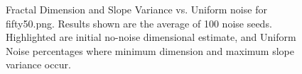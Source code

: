 \documentclass[12pt, oneside]{book}
\begin{document}
\begin{figure}[!b]
  \centering
  \caption[Fractal Dimension and Slope Variance vs. Uniform noise for fifty50.png.]{Fractal Dimension and Slope Variance vs. Uniform noise for fifty50.png.  Results shown are the average of 100 noise seeds.  Highlighted are initial no-noise dimensional estimate, and Uniform Noise percentages where minimum dimension and maximum slope variance occur.}
  \label{fig:fifty50_uniform_result}
\end{figure}
\end{document}
